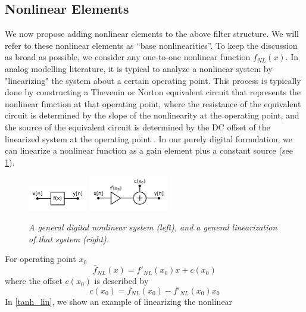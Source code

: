 \documentclass[twoside,a4paper]{article}
\begin{document}
\subsection{Nonlinear Elements}
%
We now propose adding nonlinear elements to the above filter structure.
We will refer to these nonlinear elements as ``base nonlinearities''.
To keep the discussion as broad as possible, we consider any one-to-one
nonlinear function $f_{NL}(x)$.
\newline\newline
In analog modelling literature, it is typical to analyze a nonlinear
system by "linearizing" the system about a certain operating
point. This process is typically done by constructing a Thevenin or
Norton equivalent circuit that represents the nonlinear function at
that operating point, where the resistance of the equivalent circuit
is determined by the slope of the nonlinearity at the operating point,
and the source of the equivalent circuit is determined by the DC
offset of the linearized system at the operating point
\cite{Germain,BernersDAFX}.
\newline\newline
In our purely digital formulation, we can linearize a nonlinear function
as a gain element plus a constant source (see \cref{linize}).
%
\begin{figure}[!ht]
    \center
    \includegraphics[width=1.0in]{../Pics/NL_sys_trim_white.png}
    \includegraphics[width=1.4in]{../Pics/NL_sys_lin_white.png}
    \caption{\label{linize}{\it A general digital nonlinear system (left),
                                and a general linearization of that system (right).}}
\end{figure}
%
For operating point $x_0$
%
\begin{equation}
    \bar{f}_{NL}(x) = f'_{NL}(x_0)x + c(x_0)
    \label{eq:linearized}
\end{equation}
%
where the offset $c(x_0)$ is described by
%
\begin{equation}
    c(x_0) = f_{NL}(x_0) - f'_{NL}(x_0)x_0
    \label{eq:lin_off}
\end{equation}
%
In \cref{tanh_lin}, we show an example of linearizing the nonlinear
\end{document}
